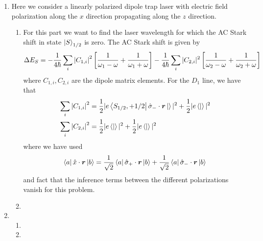 \documentclass{article}
\theoremstyle{definition}
\newcommand{\f}[2]{\frac{#1}{#2}}
\newcommand{\lb}{\left[}
\newcommand{\rb}{\right]}
\begin{document}
\begin{enumerate}[label=(\alph*)]
	\item Here we consider a linearly polarized dipole trap laser with electric field polarization along the $x$ direction propagating along the $z$ direction. 
	
	\begin{enumerate}[label=(\roman*)]
		\item For this part we want to find the laser wavelength for which the AC Stark shift in state $\ket{S}_{1/2}$ is zero. The AC Stark shift is given by 
		\begin{align*}
			\Delta E_S = -\f{1}{4\hbar} \sum_i \abs{C_{1,i}}^2 \lb \f{1}{\omega_1 - \omega} + \f{1}{\omega_1+\omega} \rb  -\f{1}{4\hbar} \sum_i |C_{2,i}|^2 \lb \f{1}{\omega_2 - \omega} + \f{1}{\omega_2+\omega} \rb
		\end{align*}
	where $C_{1,i}, C_{2,i}$ are the dipole matrix elements. For the $D_1$ line, we have that
	\begin{align*}
		 &\sum_i \abs{C_{1,i}}^2 = \f{1}{2}|e\bra{S_{1/2},+1/2} \hat{\sigma}_-\cdot \bm{r} \ket{}|^2 + \f{1}{2} |e\bra{} \ket{}|^2\\
		 &\sum_i \abs{C_{2,i}}^2 = \f{1}{2}|e\bra{} \ket{}|^2 + \f{1}{2} |e\bra{} \ket{}|^2
	\end{align*}
	where we have used
	\begin{align*}
		\bra{a} \hat{x} \cdot \bm{r} \ket{b} = \f{1}{\sqrt{2}}  \bra{a} \hat{\sigma}_+ \cdot \bm{r} \ket{b} + \f{1}{\sqrt{2}} \bra{a} \hat{\sigma}_- \cdot \bm{r} \ket{b}
	\end{align*}
	and fact that the inference terms between the different polarizations vanish for this problem. 
		
		
		\item 
		

	\end{enumerate}
	
	\item 
	
	\begin{enumerate}[label=(\roman*)]
		\item 
		
		\item 
		
		
	\end{enumerate}
\end{enumerate}
	
	
\end{document}

